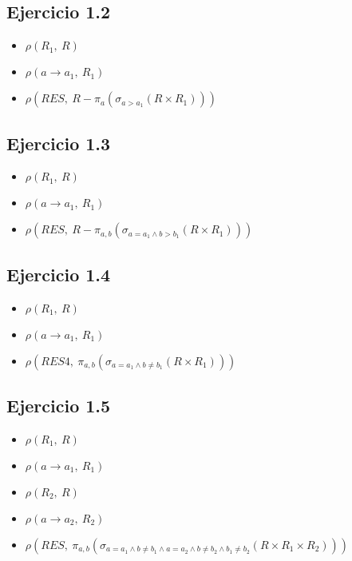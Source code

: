 \begin{multicols}{2}
\subsection{Ejercicio 1.2}
\begin{itemize}
	\item[] $\rho(R_1,~R)$
	\item[] $\rho(a \rightarrow a_1,~R_1)$
	\item[] $\rho(RES,~R - \pi_a(\sigma_{a > a_1}(R\times R_1)))$
\end{itemize}

	\subsection{Ejercicio 1.3}
	\begin{itemize}
		\item[] $\rho(R_1,~R)$
		\item[] $\rho(a \rightarrow a_1,~R_1)$
		\item[] $\rho(RES,~R - \pi_{a, b}(\sigma_{a = a_1 \land b > b_1}(R\times R_1)))$
	\end{itemize}
	
	\subsection{Ejercicio 1.4}
	\begin{itemize}
		\item[] $\rho(R_1,~R)$
		\item[] $\rho(a \rightarrow a_1,~R_1)$
		\item[] $\rho(RES4,~\pi_{a, b}(\sigma_{a = a_1 \land b \neq b_1}(R\times R_1)))$
	\end{itemize}
	
	\subsection{Ejercicio 1.5}
	\begin{itemize}
		\item[] $\rho(R_1,~R)$
		\item[] $\rho(a \rightarrow a_1,~R_1)$
		\item[] $\rho(R_2,~R)$
		\item[] $\rho(a \rightarrow a_2,~R_2)$
		\item[] $\rho(RES,~\pi_{a, b}(\sigma_{a = a_1 \land b \neq b_1 \land a = a_2 \land b \neq b_2 \land b_1 \neq b_2}(R\times R_1\times R_2)))$
	\end{itemize}	
\end{multicols}

